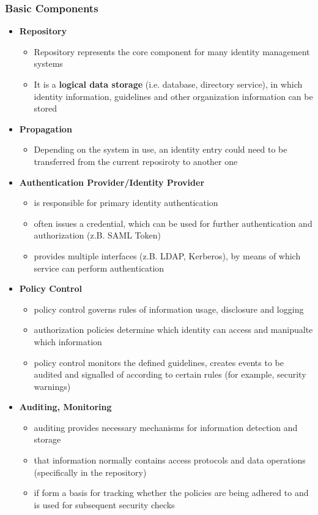 \documentclass[11pt]{article}
\begin{document}
\subsubsection{Basic Components}
\label{sec:org8d35c92}
\begin{itemize}
\item \textbf{Repository}
\begin{itemize}
\item Repository represents the core component for many identity management systems
\item It is a \textbf{logical data storage} (i.e. database, directory service), in which identity information, guidelines and other organization information can be stored
\end{itemize}
\item \textbf{Propagation}
\begin{itemize}
\item Depending on the system in use, an identity entry could need to be transferred from the current reposiroty to another one
\end{itemize}
\item \textbf{Authentication Provider/Identity Provider}
\begin{itemize}
\item is responsible for primary identity authentication
\item often issues a credential, which can be used for further authentication and authorization (z.B. SAML Token)
\item provides multiple interfaces (z.B. LDAP, Kerberos), by means of which service can perform authentication
\end{itemize}
\item \textbf{Policy Control}
\begin{itemize}
\item policy control governs rules of information usage, disclosure and logging
\item authorization policies determine which identity can access and manipualte which information
\item policy control monitors the defined guidelines, creates events to be audited and signalled of according to certain rules (for example, security warnings)
\end{itemize}
\item \textbf{Auditing, Monitoring}
\begin{itemize}
\item auditing provides necessary mechanisms for information detection and storage
\item that information normally contains access protocols and data operations (specifically in the repository)
\item if form a basis for tracking whether the policies are being adhered to and is used for subsequent security checks
\end{itemize}
\end{itemize}
\end{document}
